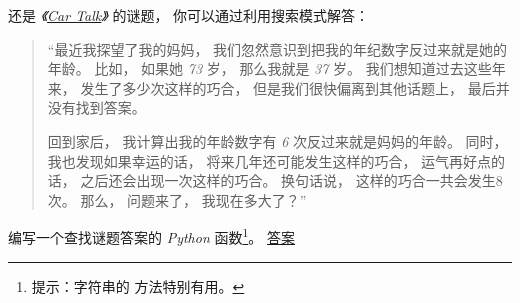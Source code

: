 \begin{exercise}

还是 {\em 《\href{http://www.cartalk.com/content/puzzlers}{Car Talk}》} 的谜题， 你可以通过利用搜索模式解答：
    


\begin{quote}

    ``最近我探望了我的妈妈， 我们忽然意识到把我的年纪数字反过来就是她的年龄。  比如， 如果她 {\em 73} 岁， 那么我就是 {\em 37} 岁。
    我们想知道过去这些年来， 发生了多少次这样的巧合， 但是我们很快偏离到其他话题上， 最后并没有找到答案。

    回到家后， 我计算出我的年龄数字有 {\em 6} 次反过来就是妈妈的年龄。
    同时， 我也发现如果幸运的话， 将来几年还可能发生这样的巧合，
    运气再好点的话， 之后还会出现一次这样的巧合。
    换句话说， 这样的巧合一共会发生8次。  那么， 问题来了， 我现在多大了？''

\end{quote}


编写一个查找谜题答案的 {\em Python} 函数\footnote{提示：字符串的  方法特别有用。  }。
\href{http://thinkpython2.com/code/cartalk3.py}{答案}


\end{exercise}
